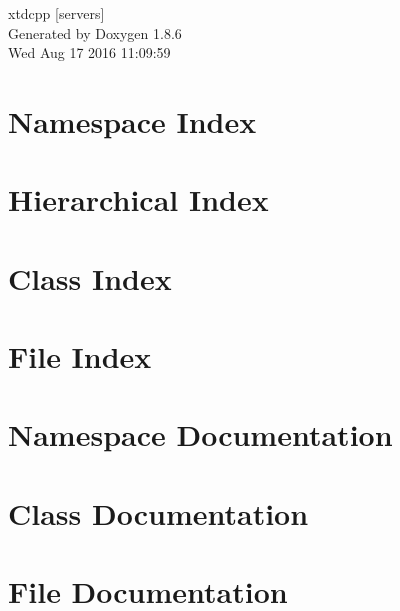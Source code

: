 \documentclass[twoside]{book}
\newcommand{\clearemptydoublepage}{%
  \newpage{\pagestyle{empty}\cleardoublepage}%
}
\begin{document}
\hypersetup{pageanchor=false}
\begin{titlepage}
\vspace*{7cm}
\begin{center}%
{\Large xtdcpp \mbox{[}servers\mbox{]} }\\
\vspace*{1cm}
{\large Generated by Doxygen 1.8.6}\\
\vspace*{0.5cm}
{\small Wed Aug 17 2016 11:09:59}\\
\end{center}
\end{titlepage}
\clearemptydoublepage
\tableofcontents
\clearemptydoublepage
{}
\hypersetup{pageanchor=true}

\chapter{Namespace Index}

\chapter{Hierarchical Index}

\chapter{Class Index}

\chapter{File Index}

\chapter{Namespace Documentation}




\chapter{Class Documentation}










\chapter{File Documentation}













\newpage
{}
{}
\printindex
\end{document}
